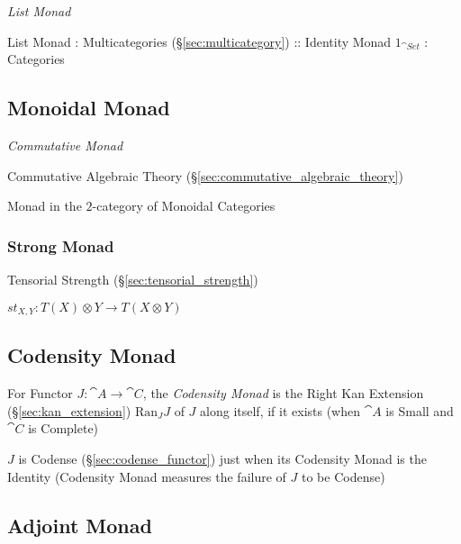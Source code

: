 \emph{List Monad}

List Monad : Multicategories (\S\ref{sec:multicategory}) :: Identity
Monad $1_{\cat{Set}}$ : Categories



\subsection{Monoidal Monad}\label{sec:monoidal_monad}

\emph{Commutative Monad}

Commutative Algebraic Theory
(\S\ref{sec:commutative_algebraic_theory})

Monad in the $2$-category of Monoidal Categories




\subsubsection{Strong Monad}\label{sec:strong_monad}

Tensorial Strength (\S\ref{sec:tensorial_strength})

$st_{X,Y} : T(X) \otimes Y \rightarrow T(X \otimes Y)$



\subsection{Codensity Monad}\label{sec:codensity_monad}

For Functor $J : \cat{A} \rightarrow \cat{C}$, the \emph{Codensity
  Monad} is the Right Kan Extension (\S\ref{sec:kan_extension})
$\mathrm{Ran}_J J$ of $J$ along itself, if it exists (when $\cat{A}$
is Small and $\cat{C}$ is Complete)

$J$ is Codense (\S\ref{sec:codense_functor}) just when its Codensity
Monad is the Identity (Codensity Monad measures the failure of $J$ to
be Codense)



\subsection{Adjoint Monad}\label{sec:adjoint_monad}

